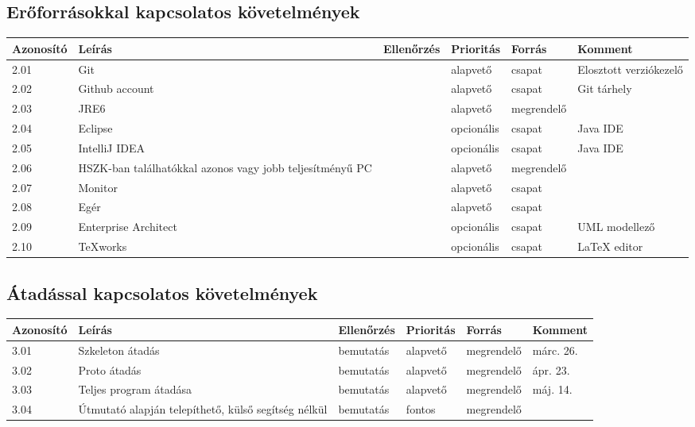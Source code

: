 \subsection{Erőforrásokkal kapcsolatos követelmények}


\begin{longtable}{| l | p{5cm} | l | l | l | l |}
\hline
\textbf{Azonosító}   & \textbf{Leírás} & \textbf{Ellenőrzés} & \textbf{Prioritás} & \textbf{Forrás} & \textbf{Komment} \tabularnewline
\hline\hline
2.01 & Git &  & alapvető & csapat & Elosztott verziókezelő \tabularnewline
\hline
2.02 & Github account &  & alapvető & csapat & Git tárhely \tabularnewline
\hline
2.03 & JRE6 &  & alapvető & megrendelő & \tabularnewline
\hline
2.04 & Eclipse &  & opcionális & csapat & Java IDE \tabularnewline
\hline
2.05 & IntelliJ IDEA &  & opcionális & csapat & Java IDE \tabularnewline
\hline
2.06 & HSZK-ban találhatókkal azonos vagy jobb teljesítményű PC &  & alapvető & megrendelő &  \tabularnewline
\hline
2.07 & Monitor &  & alapvető & csapat &  \tabularnewline
\hline
2.08 & Egér &  & alapvető & csapat &  \tabularnewline
\hline
2.09 & Enterprise Architect &  & opcionális & csapat & UML modellező \tabularnewline
\hline
2.10 & TeXworks &  & opcionális & csapat & LaTeX editor \tabularnewline
\hline
\end{longtable}


\subsection{Átadással kapcsolatos követelmények}

\begin{longtable}{| l | p{5cm} | l | l | l | l |}
\hline
\textbf{Azonosító}   & \textbf{Leírás} & \textbf{Ellenőrzés} & \textbf{Prioritás} & \textbf{Forrás} & \textbf{Komment} \tabularnewline
\hline\hline
3.01 & Szkeleton átadás & bemutatás & alapvető & megrendelő & márc. 26. \tabularnewline
\hline
3.02 & Proto átadás & bemutatás & alapvető & megrendelő & ápr. 23. \tabularnewline
\hline
3.03 & Teljes program átadása & bemutatás & alapvető & megrendelő & máj. 14. \tabularnewline
\hline
3.04 & Útmutató alapján telepíthető, külső segítség nélkül & bemutatás & fontos & megrendelő &  \tabularnewline
\hline
\end{longtable}

